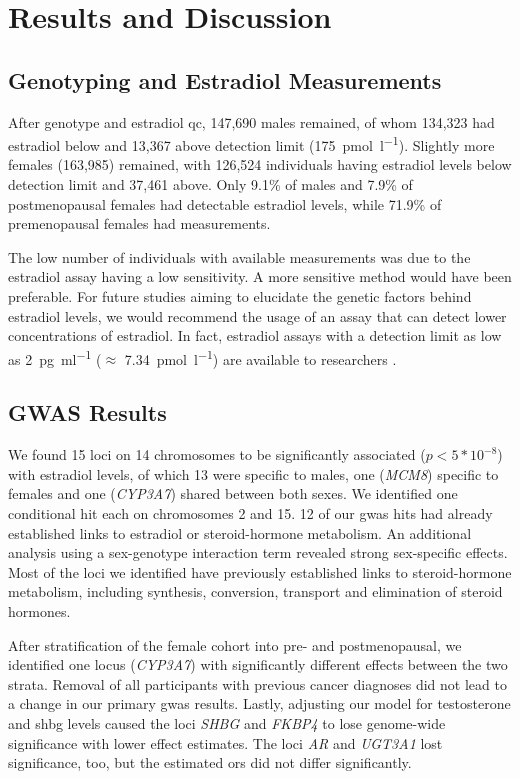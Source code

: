 \documentclass[twoside=false]{scrbook}
\begin{document}
\section{Results and Discussion}
\label{sec:p1discussion}
\subsection{Genotyping and Estradiol Measurements}
After genotype and estradiol \gls{qc}, 147,690 males remained, of whom 134,323 had estradiol below and 13,367 above detection limit (\qty{175}{\pmol\per\l}).
Slightly more females (163,985) remained, with 126,524 individuals having estradiol levels below detection limit and 37,461 above.
Only 9.1\% of males and 7.9\% of postmenopausal females had detectable estradiol levels, while 71.9\% of premenopausal females had measurements.

The low number of individuals with available measurements was due to the estradiol assay having a low sensitivity.
A more sensitive method would have been preferable.
For future studies aiming to elucidate the genetic factors behind estradiol levels, we would recommend the usage of an assay that can detect lower concentrations of estradiol.
In fact, estradiol assays with a detection limit as low as \qty{2}{\pg\per\ml} ($\approx$ \qty{7.34}{\pmol\per\l}) are available to researchers \cite{Travison2014}.

\subsection{GWAS Results}
We found 15 loci on 14 chromosomes to be significantly associated ($p < 5*10^{-8}$) with estradiol levels, of which 13 were specific to males, one (\textit{MCM8}) specific to females and one (\textit{CYP3A7}) shared between both sexes.
We identified one conditional hit each on chromosomes 2 and 15.
12 of our \gls{gwas} hits had already established links to estradiol or steroid-hormone metabolism.
An additional analysis using a sex-genotype interaction term revealed strong sex-specific effects.
Most of the loci we identified have previously established links to steroid-hormone metabolism, including synthesis, conversion, transport and elimination of steroid hormones.

After stratification of the female cohort into pre- and postmenopausal, we identified one locus (\textit{CYP3A7}) with significantly different effects between the two strata.
Removal of all participants with previous cancer diagnoses did not lead to a change in our primary \gls{gwas} results.
Lastly, adjusting our model for testosterone and \gls{shbg} levels caused the loci \textit{SHBG} and \textit{FKBP4} to lose genome-wide significance with lower effect estimates.
The loci \textit{AR} and \textit{UGT3A1} lost significance, too, but the estimated \glspl{or} did not differ significantly.
\end{document}
